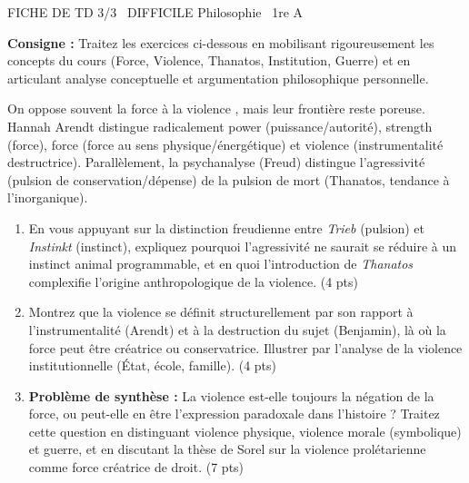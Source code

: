 \documentclass[11pt]{article}
\begin{document}
\begin{tcolorbox}[enhanced,colback=popink,colframe=popink,arc=10pt,boxrule=0pt,left=12pt,right=12pt,top=9pt,bottom=9pt]
{\color{white}\popxbold\small FICHE DE TD 3/3 \textbullet\ DIFFICILE \hfill Philosophie \textbullet\ 1re A\par}
\end{tcolorbox}
\vspace{4pt}
\noindent\textbf{Consigne :} Traitez les exercices ci-dessous en mobilisant rigoureusement les concepts du cours (Force, Violence, Thanatos, Institution, Guerre) et en articulant analyse conceptuelle et argumentation philosophique personnelle.

\begin{exercice}
On oppose souvent la \og force \fg{} à la \og violence \fg{}, mais leur frontière reste poreuse. Hannah Arendt distingue radicalement \og power \fg{} (puissance/autorité), \og strength \fg{} (force), \og force \fg{} (force au sens physique/énergétique) et \og violence \fg{} (instrumentalité destructrice). Parallèlement, la psychanalyse (Freud) distingue l'agressivité (pulsion de conservation/dépense) de la pulsion de mort (Thanatos, tendance à l'inorganique).

\begin{enumerate}
    \item En vous appuyant sur la distinction freudienne entre \textit{Trieb} (pulsion) et \textit{Instinkt} (instinct), expliquez pourquoi l'agressivité ne saurait se réduire à un instinct animal programmable, et en quoi l'introduction de \textit{Thanatos} complexifie l'origine anthropologique de la violence. (4 pts)
    \item Montrez que la violence se définit structurellement par son rapport à l'\og instrumentalité \fg{} (Arendt) et à la \og destruction du sujet \fg{} (Benjamin), là où la force peut être créatrice ou conservatrice. Illustrer par l'analyse de la \og violence institutionnelle \fg{} (État, école, famille). (4 pts)
    \item \textbf{Problème de synthèse :} \og La violence est-elle toujours la négation de la force, ou peut-elle en être l'expression paradoxale dans l'histoire ? \fg{} Traitez cette question en distinguant violence physique, violence morale (symbolique) et guerre, et en discutant la thèse de Sorel sur la \og violence prolétarienne \fg{} comme force créatrice de droit. (7 pts)
\end{enumerate}
\end{exercice}
\end{document}
